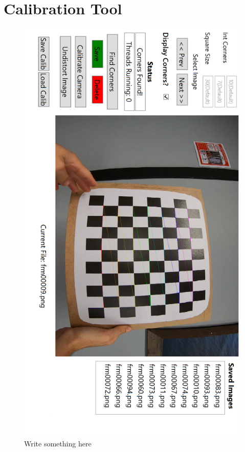 \documentclass{UoNMCHA}
\numberwithin{equation}{section}
\begin{document}
\section{Calibration Tool}\label{app:calibrationTool}
\begin{figure}[ht]
    \begin{center}
        \includegraphics[width=.6\linewidth]{Figures/Calibration_Tool}
        \caption{Write something here}
        \label{fig:PinholeModel}
    \end{center}
\end{figure}
\end{document}
